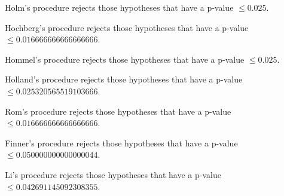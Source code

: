 \documentclass[a4paper,10pt]{article}
\begin{document}
\begin{landscape}
Holm's procedure rejects those hypotheses that have a p-value $\le0.025$.


Hochberg's procedure rejects those hypotheses that have a p-value $\le0.016666666666666666$.


Hommel's procedure rejects those hypotheses that have a p-value $\le0.025$.


Holland's procedure rejects those hypotheses that have a p-value $\le0.025320565519103666$.


Rom's procedure rejects those hypotheses that have a p-value $\le0.016666666666666666$.


Finner's procedure rejects those hypotheses that have a p-value $\le0.050000000000000044$.


Li's procedure rejects those hypotheses that have a p-value $\le0.042691145092308355$.



\newpage


\end{landscape}
\end{document}
